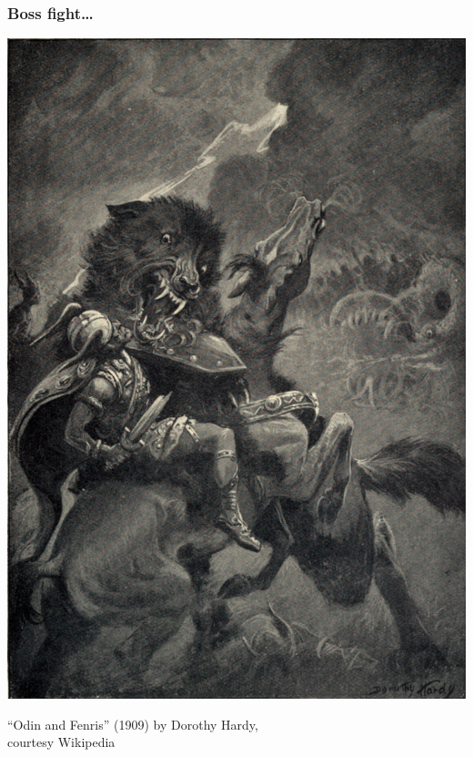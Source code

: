 \begin{frame}
\frametitle{Boss fight\ldots}

\begin{center}
\includegraphics[height=.8\textheight]{images/L10-odin-and-fenris.jpg}

``Odin and Fenris'' (1909) by Dorothy Hardy, \\
courtesy Wikipedia
\end{center}
\end{frame}




